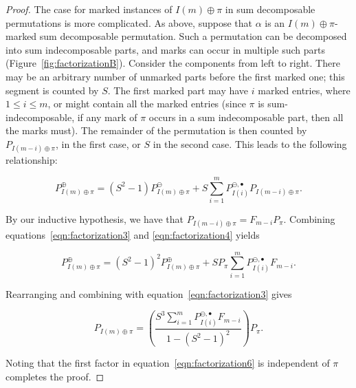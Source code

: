 \documentclass[10pt]{article}
\theoremstyle{definition}
\numberwithin{equation}{section}
\numberwithin{figure}{section}
\begin{document}
\begin{proof}
The case for marked instances of $I(m) \oplus \pi$ in sum decomposable permutations is more complicated. As above, suppose that $\alpha$ is an $I(m) \oplus \pi$-marked sum decomposable permutation. Such a permutation can be decomposed into sum indecomposable parts, and marks can occur in multiple such parts (Figure~\ref{fig:factorizationB}). Consider the components from left to right. There may be an arbitrary number of unmarked parts before the first marked one; this segment is counted by $S$.  The first marked part may have $i$ marked entries, where $1 \leq i \leq m$, or might contain all the marked entries (since $\pi$ is sum-indecomposable, if any mark of $\pi$ occurs in a sum indecomposable part, then all the marks must). The remainder of the permutation is then counted by $P_{I(m-i) \oplus \pi}$, in the first case, or $S$ in the second case. This leads to the following relationship:

    \begin{equation}\label{eqn:factorization4}
      P_{I(m) \oplus \pi}^\oplus = (S^2 - 1) P_{I(m) \oplus \pi}^\ominus
        + S \sum_{i = 1}^m P_{I(i)}^{\ominus, \bullet} 
        P_{I(m-i) \oplus \pi}.
    \end{equation}

    By our inductive hypothesis, we have that $P_{I(m-i) \oplus \pi} = F_{m-i} P_\pi$. Combining equations~\ref{eqn:factorization3} and \ref{eqn:factorization4} yields
    
    \begin{equation}\label{eqn:factorization5}
      P_{I(m) \oplus \pi}^\oplus = (S^2 - 1)^2 P_{I(m) \oplus \pi}^\oplus
        + S P_\pi \sum_{i = 1}^m  P_{I(i)}^{\ominus, \bullet} 
        F_{m-i}.
    \end{equation}
      
    Rearranging and combining with equation~\ref{eqn:factorization3} gives

    \begin{equation}\label{eqn:factorization6}
      P_{I(m) \oplus \pi} = \left(
      \frac{S^3 \sum_{i = 1}^m  P_{I(i)}^{\ominus, \bullet} 
      F_{m-i}}{1 - (S^2-1)^2} \right) P_\pi.
    \end{equation}

    Noting that the first factor in equation~\ref{eqn:factorization6} is independent of $\pi$ completes the proof. 
  \end{proof}
  
\end{document}
